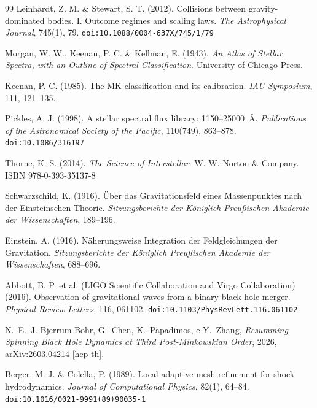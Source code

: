 \documentclass[12pt,a4paper]{article}
\begin{document}
\begin{thebibliography}{99}
Leinhardt, Z. M. \& Stewart, S. T. (2012).
Collisions between gravity-dominated bodies. I. Outcome regimes and scaling laws.
\textit{The Astrophysical Journal}, 745(1), 79.
\texttt{doi:10.1088/0004-637X/745/1/79}


Morgan, W. W., Keenan, P. C. \& Kellman, E. (1943).
\textit{An Atlas of Stellar Spectra, with an Outline of Spectral Classification}.
University of Chicago Press.

Keenan, P. C. (1985).
The MK classification and its calibration.
\textit{IAU Symposium}, 111, 121--135.

Pickles, A. J. (1998).
A stellar spectral flux library: 1150--25000~\AA.
\textit{Publications of the Astronomical Society of the Pacific}, 110(749), 863--878.
\texttt{doi:10.1086/316197}


Thorne, K. S. (2014).
\textit{The Science of Interstellar}.
W. W. Norton \& Company.
ISBN 978-0-393-35137-8


Schwarzschild, K. (1916).
\"{U}ber das Gravitationsfeld eines Massenpunktes nach der Einsteinschen Theorie.
\textit{Sitzungsberichte der K\"{o}niglich Preu{\ss}ischen Akademie der Wissenschaften}, 189--196.

Einstein, A. (1916).
N\"{a}herungsweise Integration der Feldgleichungen der Gravitation.
\textit{Sitzungsberichte der K\"{o}niglich Preu{\ss}ischen Akademie der Wissenschaften}, 688--696.

Abbott, B. P. et al. (LIGO Scientific Collaboration and Virgo Collaboration) (2016).
Observation of gravitational waves from a binary black hole merger.
\textit{Physical Review Letters}, 116, 061102.
\texttt{doi:10.1103/PhysRevLett.116.061102}

N.~E.~J. Bjerrum-Bohr, G.~Chen, K.~Papadimos, e Y.~Zhang,
\emph{Resumming Spinning Black Hole Dynamics at Third Post-Minkowskian Order},
2026, arXiv:2603.04214 [hep-th].


Berger, M. J. \& Colella, P. (1989).
Local adaptive mesh refinement for shock hydrodynamics.
\textit{Journal of Computational Physics}, 82(1), 64--84.
\texttt{doi:10.1016/0021-9991(89)90035-1}


\end{thebibliography}
\end{document}
